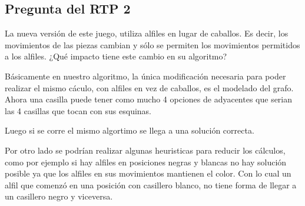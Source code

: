 \subsection{Pregunta del RTP 2}

La nueva versi\'on de este juego, utiliza alfiles en lugar de caballos. Es decir, los movimientos de las piezas cambian y s\'olo se permiten los movimientos permitidos a los alfiles.
¿Qu\'e impacto tiene este cambio en su algoritmo?

B\'asicamente en nuestro algoritmo, la \'unica modificaci\'on necesaria para poder realizar el mismo c\'aculo, con alfiles en vez de caballos, es el modelado del grafo. Ahora una casilla puede tener como mucho 4 opciones de adyacentes que serian las 4 casillas que tocan con sus esquinas.

Luego si se corre el mismo algortimo se llega a una solución correcta.

Por otro lado se podrían realizar algunas heuristicas para reducir los cálculos, como por ejemplo si hay alfiles en posiciones negras y blancas no hay solución posible ya que los alfiles en sus movimientos mantienen el color. Con lo cual un alfil que comenzó en una posición con casillero blanco, no tiene forma de llegar a un casillero negro y viceversa.